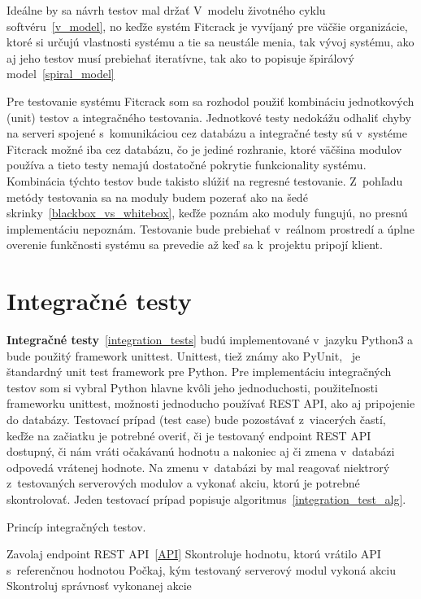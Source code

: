  Ideálne by sa návrh testov mal držať V~modelu životného cyklu softvéru~\ref{v_model}, no keďže systém Fitcrack je vyvíjaný pre väčšie organizácie, ktoré si určujú vlastnosti systému a tie sa neustále menia, tak vývoj systému, ako aj jeho testov musí prebiehať iteratívne, tak ako to popisuje špirálový model~\ref{spiral_model}

Pre testovanie systému Fitcrack som sa rozhodol použiť kombináciu jednotkových (unit) testov a integračného testovania.
Jednotkové testy nedokážu odhaliť chyby na serveri spojené s~komunikáciou cez databázu a integračné testy sú v~systéme Fitcrack možné iba cez databázu, čo je jediné rozhranie, ktoré väčšina modulov používa a tieto testy nemajú dostatočné pokrytie funkcionality systému.
Kombinácia týchto testov bude takisto slúžiť na regresné testovanie.
Z~pohľadu metódy testovania sa na moduly budem pozerať ako na šedé skrinky~\ref{blackbox_vs_whitebox}, keďže poznám ako moduly fungujú, no presnú implementáciu nepoznám.
Testovanie bude prebiehať v~reálnom prostredí a úplne overenie funkčnosti systému sa prevedie až keď sa k~projektu pripojí klient.

\section{Integračné testy}
\textbf{Integračné testy}~\ref{integration_tests} budú implementované v~jazyku Python3 a bude použitý framework unittest.
Unittest, tiež známy ako PyUnit,~\cite{unittest} je štandardný unit test framework pre Python.
Pre implementáciu integračných testov som si vybral Python hlavne kvôli jeho jednoduchosti, použiteľnosti frameworku unittest, možnosti jednoducho používať REST API, ako aj pripojenie do databázy.
Testovací prípad (test case) bude pozostávať z~viacerých častí, keďže na začiatku je potrebné overiť, či je testovaný endpoint REST API dostupný, či nám vráti očakávanú hodnotu a nakoniec aj či zmena v~databázi odpovedá vrátenej hodnote.
Na zmenu v~databázi by mal reagovať niektrorý z~testovaných serverových modulov a vykonať akciu, ktorú je potrebné skontrolovať.
Jeden testovací prípad popisuje algoritmus~\ref{integration_test_alg}.

\begin{algorithm}[h]
	\label{integration_test_alg}
	\caption{Princíp integračných testov.}
	\DontPrintSemicolon
	Zavolaj endpoint REST API~\ref{API}\;
	Skontroluje hodnotu, ktorú vrátilo API s~referenčnou hodnotou\;
	Počkaj, kým testovaný serverový modul vykoná akciu\;
	Skontroluj správnosť vykonanej akcie\;
\end{algorithm}

